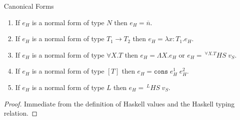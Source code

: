 \begin{hcf}
\label{hcf}
Canonical Forms
\begin{enumerate}
\item If $e_{H}$ is a normal form of type $N$ then $e_{H}=\overline{n}$.
\item If $e_{H}$ is a normal form of type $T_{1}\rightarrow T_{2}$ then $e_{H}=\lambda x:T_{1}.e_{H}$.
\item If $e_{H}$ is a normal form of type $\forall X.T$ then $e_{H}=\Lambda X.e_{H}$ or $e_{H}=\,^{\forall X.T}HS\;v_{S}$.
\item If $e_{H}$ is a normal form of type $[T]$ then $e_{H}=\mathtt{cons}\;e_{H}^{1}\;e_{H}^{2}$.
\item If $e_{H}$ is a normal form of type $L$ then $e_{H}=\,^{L}HS\;v_{S}$.
\end{enumerate}
\begin{proof}
Immediate from the definition of Haskell values and the Haskell typing relation.
\end{proof}
\end{hcf}
